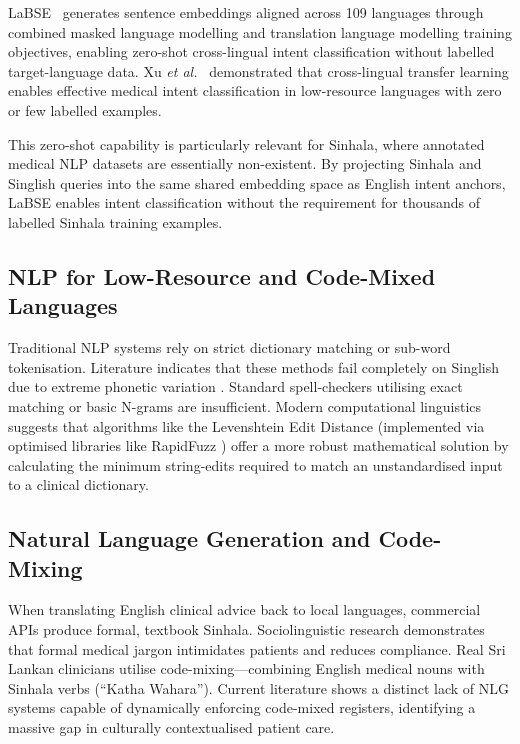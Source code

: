 \documentclass[12pt,a4paper]{report}
\begin{document}
LaBSE~\cite{Feng2022} generates sentence embeddings aligned across 109 languages through combined masked language modelling and translation language modelling training objectives, enabling zero-shot cross-lingual intent classification without labelled target-language data. Xu \textit{et al.}~\cite{Xu2022} demonstrated that cross-lingual transfer learning enables effective medical intent classification in low-resource languages with zero or few labelled examples.

This zero-shot capability is particularly relevant for Sinhala, where annotated medical NLP datasets are essentially non-existent. By projecting Sinhala and Singlish queries into the same shared embedding space as English intent anchors, LaBSE enables intent classification without the requirement for thousands of labelled Sinhala training examples.

\subsection{NLP for Low-Resource and Code-Mixed Languages}

Traditional NLP systems rely on strict dictionary matching or sub-word tokenisation. Literature indicates that these methods fail completely on Singlish due to extreme phonetic variation \cite{Levenshtein1966}. Standard spell-checkers utilising exact matching or basic N-grams are insufficient. Modern computational linguistics suggests that algorithms like the Levenshtein Edit Distance (implemented via optimised libraries like RapidFuzz \cite{Maxmilian2023}) offer a more robust mathematical solution by calculating the minimum string-edits required to match an unstandardised input to a clinical dictionary.

\subsection{Natural Language Generation and Code-Mixing}

When translating English clinical advice back to local languages, commercial APIs produce formal, textbook Sinhala. Sociolinguistic research demonstrates that formal medical jargon intimidates patients and reduces compliance. Real Sri Lankan clinicians utilise code-mixing---combining English medical nouns with Sinhala verbs (``Katha Wahara''). Current literature shows a distinct lack of NLG systems capable of dynamically enforcing code-mixed registers, identifying a massive gap in culturally contextualised patient care.
\end{document}
